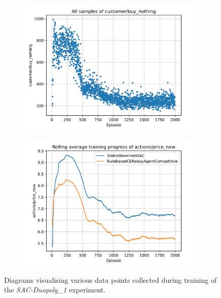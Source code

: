 \begin{figure}[t]
	\begin{subfigure}{0.49\textwidth}
		\centering
		\includegraphics[width = \textwidth]{images/experiments/SACDuopoly/SACDuopolyMixedGraphs3.pdf}\\
		\label{fig:SACDuopolyMixedGraphs3}
	\end{subfigure}
	\begin{subfigure}{0.49\textwidth}
		\centering
		\includegraphics[width = \textwidth]{images/experiments/SACDuopoly/SACDuopolyMixedGraphs4.pdf}\\
		\label{fig:SACDuopolyMixedGraphs4}
	\end{subfigure}
	\caption{Diagrams visualising various data points collected during training of the \emph{SAC-Duopoly\_1} experiment.}\label{fig:SACDuopolyMixedGraphs}
\end{figure}

